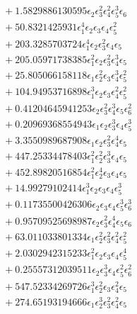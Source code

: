 \documentclass[10pt]{article}
\begin{document}
\begin{align*}
&{}  + 1.5829886130595 \epsilon_{2} \epsilon_{3}^{2} \epsilon_{4}^{2} \epsilon_{5}^{3} \epsilon_{6} \\
&{}  + 50.8321425931 \epsilon_{1}^{4} \epsilon_{2} \epsilon_{3} \epsilon_{4} \epsilon_{5}^{2} \\
&{}  + 203.3285703724 \epsilon_{1}^{4} \epsilon_{2} \epsilon_{3}^{2} \epsilon_{4} \epsilon_{5} \\
&{}  + 205.05971738385 \epsilon_{1}^{2} \epsilon_{2} \epsilon_{3}^{2} \epsilon_{4}^{3} \epsilon_{5} \\
&{}  + 25.805066158118 \epsilon_{1} \epsilon_{2}^{2} \epsilon_{3} \epsilon_{4}^{3} \epsilon_{5}^{2} \\
&{}  + 104.94953716898 \epsilon_{1}^{3} \epsilon_{2} \epsilon_{3} \epsilon_{4}^{2} \epsilon_{5}^{2} \\
&{}  + 0.41204645941253 \epsilon_{2} \epsilon_{3}^{2} \epsilon_{4}^{3} \epsilon_{5} \epsilon_{6}^{2} \\
&{}  + 0.20969368554943 \epsilon_{1} \epsilon_{2} \epsilon_{3}^{3} \epsilon_{4} \epsilon_{5}^{3} \\
&{}  + 3.3550989687908 \epsilon_{1} \epsilon_{2} \epsilon_{3}^{2} \epsilon_{4}^{4} \epsilon_{5} \\
&{}  + 447.25334478403 \epsilon_{1}^{2} \epsilon_{2}^{2} \epsilon_{3}^{3} \epsilon_{4} \epsilon_{5} \\
&{}  + 452.89820516854 \epsilon_{1}^{2} \epsilon_{2}^{4} \epsilon_{3} \epsilon_{4} \epsilon_{5} \\
&{}  + 14.99279102414 \epsilon_{1}^{3} \epsilon_{2} \epsilon_{3} \epsilon_{4} \epsilon_{5}^{3} \\
&{}  + 0.11735500426306 \epsilon_{2} \epsilon_{3} \epsilon_{4} \epsilon_{5}^{3} \epsilon_{6}^{3} \\
&{}  + 0.95709525698987 \epsilon_{2} \epsilon_{3}^{2} \epsilon_{4}^{4} \epsilon_{5} \epsilon_{6} \\
&{}  + 63.011033801334 \epsilon_{1} \epsilon_{2}^{2} \epsilon_{3}^{2} \epsilon_{4}^{2} \epsilon_{5}^{2} \\
&{}  + 2.0302942315233 \epsilon_{1}^{2} \epsilon_{2} \epsilon_{3} \epsilon_{4} \epsilon_{5}^{4} \\
&{}  + 0.25557312039511 \epsilon_{2} \epsilon_{3}^{3} \epsilon_{4} \epsilon_{5}^{2} \epsilon_{6}^{2} \\
&{}  + 547.52334269726 \epsilon_{1}^{3} \epsilon_{2}^{2} \epsilon_{3} \epsilon_{4}^{2} \epsilon_{5} \\
&{}  + 274.65193194666 \epsilon_{1} \epsilon_{2}^{3} \epsilon_{3}^{2} \epsilon_{4}^{2} \epsilon_{5} \\

\end{align*}
\end{document}
